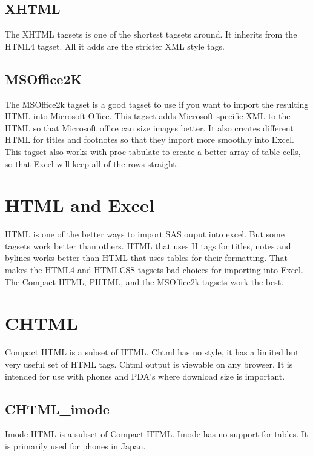 \subsection{XHTML}
The XHTML tagsets is one of the shortest tagsets around.  It inherits from the HTML4
tagset.  All it adds are the stricter XML style tags.

\subsection{MSOffice2K}
The MSOffice2k tagset is a good tagset to use if you want to import the resulting HTML
into Microsoft Office.  This tagset adds Microsoft specific XML to the HTML so that 
Microsoft office can size images better.  It also creates different HTML for titles and
footnotes so that they import more smoothly into Excel.  This tagset also works with proc
tabulate to create a better array of table cells, so that Excel will keep all of the
rows straight.

\section{HTML and Excel}
HTML is one of the better ways to import SAS ouput into excel.  But
some tagsets work better than others.  HTML that uses H tags for 
titles, notes and bylines works better than HTML that uses tables
for their formatting.  That makes the HTML4 and HTMLCSS tagsets 
bad choices for importing into Excel.  The Compact HTML, PHTML, and
the MSOffice2k tagsets work the best. 

\section{CHTML}
Compact HTML is a subset of HTML.  Chtml has no style, it has a limited but very
useful set of HTML tags.  Chtml output is viewable on any browser.  It is intended
for use with phones and PDA's where download size is important.

\subsection{CHTML\_imode}
Imode HTML is a subset of Compact HTML.  Imode has no support for tables.  It is
primarily used for phones in Japan.


